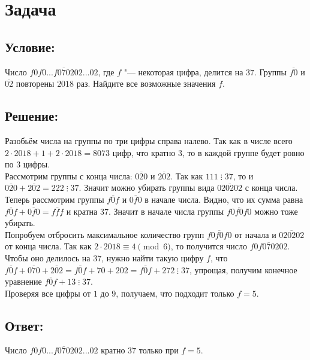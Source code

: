 \section{Задача}

\subsection*{Условие:}
Число $\overline{f0 f0 ... f0 7 02 02 ... 02}$, где $f$ "--- некоторая цифра, делится на $37$. 
Группы $\overline{f0}$ и $\overline{02}$ повторены $2018$ раз. Найдите все возможные значения $f$.

\subsection*{Решение:}
Разобьём числа на группы по три цифры справа налево. Так как в числе всего
$2\cdot2018 + 1 + 2\cdot2018 = 8073$ цифр, что кратно $3$, то в каждой группе будет ровно по $3$
цифры.\\

Рассмотрим группы с конца числа: $\overline{020}$ и $\overline{202}$. Так как
$111 \mathrel{\vdots} 37$, то и $\overline{020} + \overline{202} = 222 \mathrel{\vdots} 37$. Значит
можно убирать группы вида $\overline{020202}$ с конца числа.\\

Теперь рассмотрим группы $\overline{f0f}$ и $\overline{0f0}$ в начале числа. Видно, что их сумма
равна $\overline{f0f} + \overline{0f0} = \overline{fff}$ и кратна $37$. Значит в начале числа группы
$\overline{f0f0f0}$ можно тоже убирать.\\

Попробуем отбросить максимальное количество групп $\overline{f0f0f0}$ от начала и
$\overline{020202}$ от конца числа. Так как $2\cdot2018 \equiv 4 \pmod 6$, то получится число
$\overline{f0 f0 7 02 02}$.\\

Чтобы оно делилось на $37$, нужно найти такую цифру $f$, что
$
    \overline{f0f} + \overline{070} + \overline{202} =
    \overline{f0f} + 70 + 202 =
    \overline{f0f} + 272 \mathrel{\vdots} 37
$, упрощая, получим конечное уравнение $\overline{f0f} + 13 \mathrel{\vdots} 37$.\\

Проверяя все цифры от $1$ до $9$, получаем, что подходит только $f = 5$.
 
\subsection*{Ответ:}
Число $\overline{f0 f0 ... f0 7 02 02 ... 02}$ кратно $37$ только при $f = 5$.